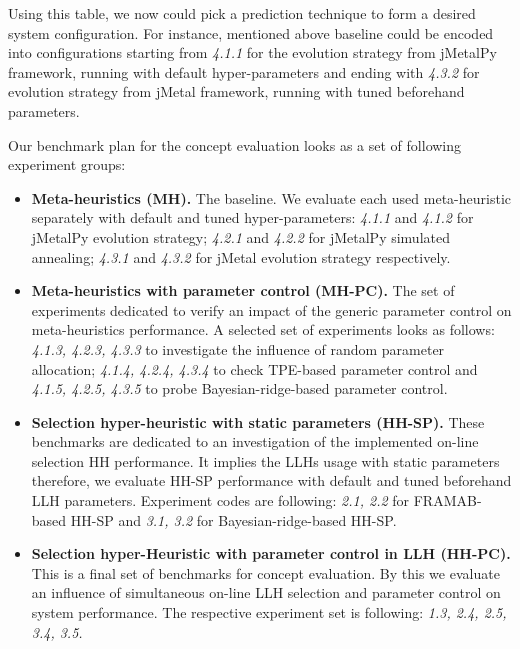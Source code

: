 Using this table, we now could pick a prediction technique to form a desired system configuration. For instance, mentioned above baseline could be encoded into configurations starting from \emph{4.1.1} for the evolution strategy from jMetalPy framework, running with default hyper-parameters and ending with \emph{4.3.2} for evolution strategy from jMetal framework, running with tuned beforehand parameters.

Our benchmark plan for the concept evaluation looks as a set of following experiment groups:
\begin{itemize}
	\item \textbf{Meta-heuristics (MH).} The baseline. We evaluate each used meta-heuristic separately with default and tuned hyper-parameters: \emph{4.1.1} and \emph{4.1.2} for jMetalPy evolution strategy;  \emph{4.2.1} and \emph{4.2.2} for jMetalPy simulated annealing; \emph{4.3.1} and \emph{4.3.2} for jMetal evolution strategy respectively.

	\item \textbf{Meta-heuristics with parameter control (MH-PC).} The set of experiments dedicated to verify an impact of the generic parameter control on meta-heuristics performance. A selected set of experiments looks as follows: \emph{4.1.3, 4.2.3, 4.3.3} to investigate the influence of random parameter allocation; \emph{4.1.4, 4.2.4, 4.3.4} to check TPE-based parameter control and \emph{4.1.5, 4.2.5, 4.3.5} to probe Bayesian-ridge-based parameter control.

	\item \textbf{Selection hyper-heuristic with static parameters (HH-SP).} These benchmarks are dedicated to an investigation of the implemented on-line selection HH performance. It implies the LLHs usage with static parameters therefore, we evaluate HH-SP performance with default and tuned beforehand LLH parameters. Experiment codes are following: \emph{2.1, 2.2} for FRAMAB-based HH-SP and \emph{3.1, 3.2} for Bayesian-ridge-based HH-SP.
	
	\item \textbf{Selection hyper-Heuristic with parameter control in LLH (HH-PC).} This is a final set of benchmarks for concept evaluation. By this we evaluate an influence of simultaneous on-line LLH selection and parameter control on system performance. The respective experiment set is following: \emph{1.3, 2.4, 2.5, 3.4, 3.5.}
\end{itemize}

